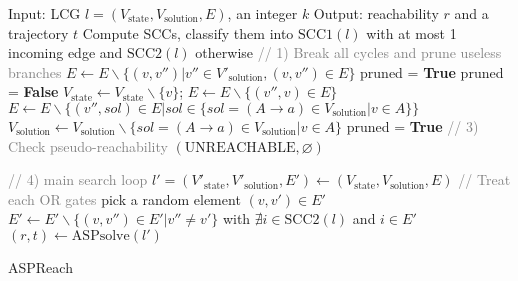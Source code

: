 \documentclass{entcs}
\begin{document}
\begin{algorithm}[htb]
\begin{algorithmic}[1]
\State Input: LCG $l=(V_{\mathrm{state}},V_{\mathrm{solution}}, E)$, an integer $k$
\State Output: reachability $r$ and a trajectory $t$
\State Compute SCCs, classify them into $\mathrm{SCC1}(l)$ with at most 1 incoming edge and $\mathrm{SCC2}(l)$ otherwise
\State \textcolor{gray}{// 1) Break all cycles and prune useless branches}\label{delete_cycle_begin}
        \State $E\gets E\backslash \{(v,v'')|v''\in V'_{\mathrm{solution}},(v,v'')\in E\}$
    \EndIf
\EndFor
\EndFor \label{delete_cycle_end}
\State{\textcolor{gray}{// 2) remove useless nodes/edges}} \label{prune_begin}
\State pruned = \textbf{True}
    \State pruned = \textbf{False}
            \State $V_{\mathrm{state}} \gets V_{\mathrm{state}}\backslash \{v\}$; $E\gets E\backslash \{ (v'',v)\in E\}$
            \State $E\gets E\backslash \{ (v'',sol)\in E | sol \in \{sol = (A \rightarrow a) \in V_{\mathrm{solution}} | v \in A\}\}$
            \State $V_{\mathrm{solution}} \gets V_{\mathrm{solution}}\backslash \{sol = (A \rightarrow a) \in V_{\mathrm{solution}} | v \in A\}$
            \State pruned = \textbf{True}
        \EndIf
    \EndFor \label{prune_end}
\EndWhile
\State \textcolor{gray}{// 3) Check pseudo-reachability} \label{pseudo_reach_begin}
    \State \Return $(\mathrm{UNREACHABLE},\varnothing)$
\EndIf \label{pseudo_reach_end}

\State \textcolor{gray}{// 4) main search loop} \label{main_loop_begin}
    \State $l'=(V'_{\mathrm{state}}, V'_{\mathrm{solution}},E')\gets(V_{\mathrm{state}}, V_{\mathrm{solution}},E)$ 
     \textcolor{gray}{// Treat each OR gates}
        \State pick a random element $(v,v') \in E'$
        \State $E'\gets E' \backslash  \{(v,v'') \in E'| v''\neq v'\}$ with $\nexists i\in \mathrm{SCC2}(l)$ and $i\in E'$
    \EndFor
    \State $(r,t)\gets\mathrm{ASPsolve}(l')$
    \EndIf
\EndFor \label{main_loop_end}
\State {}
\end{algorithmic}
\caption{ASPReach}\label{algOverall}
\end{algorithm}
\end{document}
